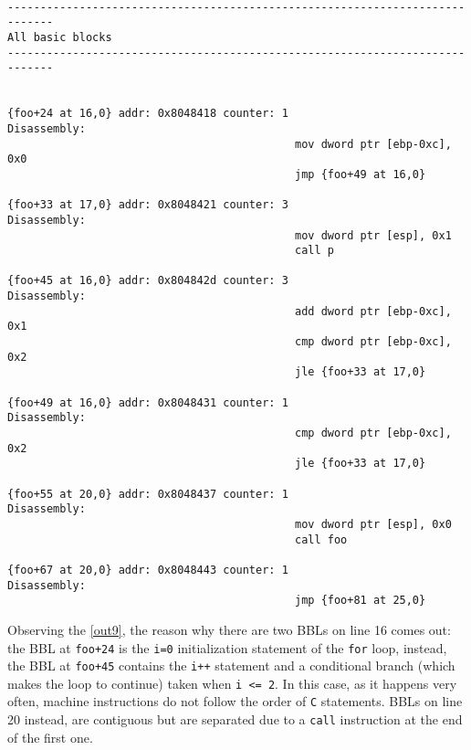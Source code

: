 \documentclass[a4paper,10pt]{report}
\begin{document}
\begin{lstlisting}[language={[x86masm]Assembler},
	label=out9, caption={a part of ``all basic blocks'' table}, frame=bottomline]

-----------------------------------------------------------------------------
All basic blocks
-----------------------------------------------------------------------------


{foo+24 at 16,0} addr: 0x8048418 counter: 1
Disassembly:
											mov dword ptr [ebp-0xc], 0x0
											jmp {foo+49 at 16,0}

{foo+33 at 17,0} addr: 0x8048421 counter: 3
Disassembly:
											mov dword ptr [esp], 0x1
											call p

{foo+45 at 16,0} addr: 0x804842d counter: 3
Disassembly:
											add dword ptr [ebp-0xc], 0x1
											cmp dword ptr [ebp-0xc], 0x2
											jle {foo+33 at 17,0}

{foo+49 at 16,0} addr: 0x8048431 counter: 1
Disassembly:
											cmp dword ptr [ebp-0xc], 0x2
											jle {foo+33 at 17,0}

{foo+55 at 20,0} addr: 0x8048437 counter: 1
Disassembly:
											mov dword ptr [esp], 0x0
											call foo

{foo+67 at 20,0} addr: 0x8048443 counter: 1
Disassembly:
											jmp {foo+81 at 25,0}

\end{lstlisting}

Observing the \cref{out9}, the reason why there are two BBLs on line 16 comes out:
the BBL at \verb|foo+24| is the \verb|i=0| initialization statement
of the \verb|for| loop, instead, the BBL at \verb|foo+45| contains the \verb|i++| statement and a conditional branch (which makes the loop to continue) taken when
\verb|i <= 2|. In this case, as it happens very often, machine instructions
do not follow the order of \verb|C| statements. BBLs on line 20 instead, are contiguous
but are separated due to a \verb|call| instruction at the end of the first one.
\end{document}
